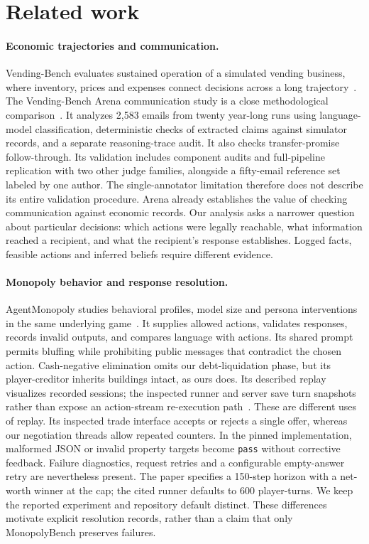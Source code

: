 \section{Related work}
\label{sec:related}

\paragraph{Economic trajectories and communication.}
Vending-Bench evaluates sustained operation of a simulated vending business, where inventory, prices and expenses connect decisions across a long trajectory~\cite{backlund2025vendingbench}. The Vending-Bench Arena communication study is a close methodological comparison~\cite{li2026arena}. It analyzes 2,583 emails from twenty year-long runs using language-model classification, deterministic checks of extracted claims against simulator records, and a separate reasoning-trace audit. It also checks transfer-promise follow-through. Its validation includes component audits and full-pipeline replication with two other judge families, alongside a fifty-email reference set labeled by one author. The single-annotator limitation therefore does not describe its entire validation procedure. Arena already establishes the value of checking communication against economic records. Our analysis asks a narrower question about particular decisions: which actions were legally reachable, what information reached a recipient, and what the recipient's response establishes. Logged facts, feasible actions and inferred beliefs require different evidence.

\paragraph{Monopoly behavior and response resolution.}
AgentMonopoly studies behavioral profiles, model size and persona interventions in the same underlying game~\cite{wu2026agentmonopoly}. It supplies allowed actions, validates responses, records invalid outputs, and compares language with actions. Its shared prompt permits bluffing while prohibiting public messages that contradict the chosen action. Cash-negative elimination omits our debt-liquidation phase, but its player-creditor inherits buildings intact, as ours does. Its described replay visualizes recorded sessions; the inspected runner and server save turn snapshots rather than expose an action-stream re-execution path~\cite{agentmonopoly2026repo}. These are different uses of replay. Its inspected trade interface accepts or rejects a single offer, whereas our negotiation threads allow repeated counters. In the pinned implementation, malformed JSON or invalid property targets become \texttt{pass} without corrective feedback. Failure diagnostics, request retries and a configurable empty-answer retry are nevertheless present. The paper specifies a 150-step horizon with a net-worth winner at the cap; the cited runner defaults to 600 player-turns. We keep the reported experiment and repository default distinct. These differences motivate explicit resolution records, rather than a claim that only MonopolyBench preserves failures.

